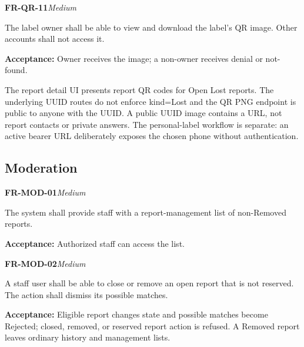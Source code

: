 \documentclass[12pt,a4paper,oneside]{report}
\begin{document}
\noindent\begin{minipage}{\linewidth}\textbf{FR-QR-11}\hfill\textit{Medium}\par\nopagebreak

The label owner shall be able to view and download the label's QR image. Other accounts shall not access it.

{\color{muted}\textbf{Acceptance:} Owner receives the image; a non-owner receives denial or not-found.\par}\end{minipage}\par\vspace{5pt}

The report detail UI presents report QR codes for Open Lost reports. The underlying UUID routes do not enforce kind=Lost and the QR PNG endpoint is public to anyone with the UUID. A public UUID image contains a URL, not report contacts or private answers. The personal-label workflow is separate: an active bearer URL deliberately exposes the chosen phone without authentication.


\subsection{Moderation}

\noindent\begin{minipage}{\linewidth}\textbf{FR-MOD-01}\hfill\textit{Medium}\par\nopagebreak

The system shall provide staff with a report-management list of non-Removed reports.

{\color{muted}\textbf{Acceptance:} Authorized staff can access the list.\par}\end{minipage}\par\vspace{5pt}

\noindent\begin{minipage}{\linewidth}\textbf{FR-MOD-02}\hfill\textit{Medium}\par\nopagebreak

A staff user shall be able to close or remove an open report that is not reserved. The action shall dismiss its possible matches.

{\color{muted}\textbf{Acceptance:} Eligible report changes state and possible matches become Rejected; closed, removed, or reserved report action is refused. A Removed report leaves ordinary history and management lists.\par}\end{minipage}\par\vspace{5pt}
\end{document}
